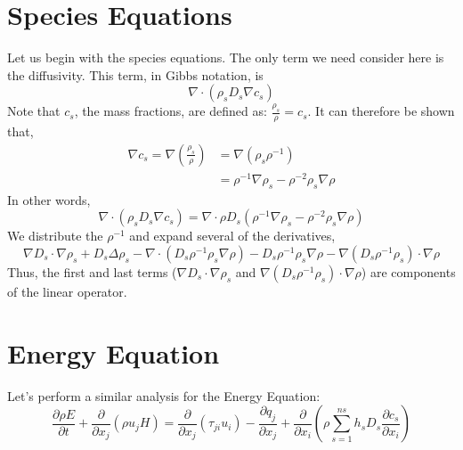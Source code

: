 \documentclass[10pt]{article}
\begin{document}
\section{Species Equations}
Let us begin with the species equations. The only term we need consider here is the diffusivity. 
This term, in Gibbs notation, is 
\begin{equation}
  \nabla \cdot (\rho_s D_s \nabla c_s)
\end{equation}
Note that $c_s$, the mass fractions, are defined as: $\frac{\rho_s}{\rho} = c_s$. 
It can therefore be shown that, 
\begin{eqnarray}
  \nabla c_s = \nabla (\frac{\rho_s}{\rho}) &= \nabla (\rho_s \rho^{-1})\\
             &= \rho^{-1} \nabla \rho_s - \rho^{-2} \rho_s \nabla \rho
\end{eqnarray}
In other words, 
\begin{equation}
  \nabla \cdot (\rho_s D_s \nabla c_s) = \nabla \cdot \rho D_s (\rho^{-1} \nabla \rho_s - \rho^{-2} \rho_s \nabla \rho)
\end{equation}
We distribute the $\rho^{-1}$ and expand several of the derivatives,
\begin{equation}
  \nabla D_s \cdot \nabla \rho_s + D_s \Delta \rho_s - \nabla \cdot (D_s \rho^{-1} \rho_s \nabla \rho) - D_s \rho^{-1} \rho_s \nabla \rho - \nabla(D_s \rho^{-1} \rho_s) \cdot \nabla \rho
\end{equation}
Thus, the first and last terms ($\nabla D_s \cdot \nabla \rho_s$ and $\nabla(D_s \rho^{-1} \rho_s) \cdot \nabla \rho$) are components of the linear operator. 

\section{Energy Equation}

Let's perform a similar analysis for the Energy Equation:
\begin{equation}
\frac{\partial \rho E}{\partial t} + \frac{\partial }{\partial x_j}(\rho
u_j H) = \frac{\partial }{\partial x_j}(\tau_{ji}u_i) - \frac{\partial
q_j}{\partial x_j} + \frac{\partial }{\partial x_i}(\rho \sum^{ns}_{s=1}
h_s D_s \frac{\partial c_s}{\partial x_i})
\end{equation}
\end{document}

